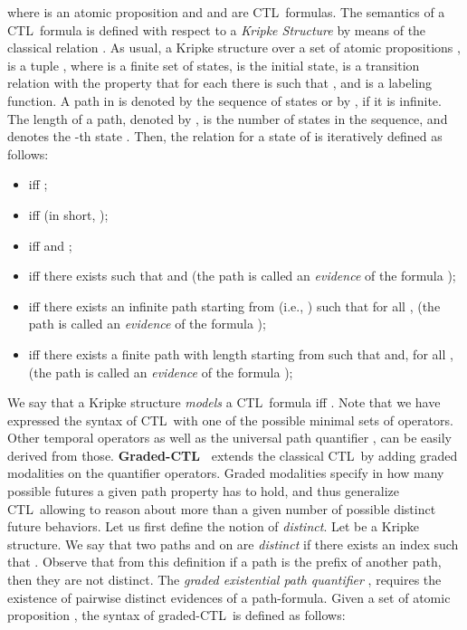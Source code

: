 \documentclass[letterpaper,twocolumn,10pt]{article}
\def    \ctl        {\mbox{\textsc{CTL }\xspace}}
\begin{document}
where  is an atomic proposition and  and
 are \ctl formulas.
The semantics of a \ctl formula is defined with respect to a
\emph{Kripke Structure} by means of the classical relation
. As usual, a Kripke structure over a set of atomic
propositions , is a tuple  , where  is a finite set of states,  is
the initial state,  is a transition
relation with the property that for each  there is  such that , and  is a
labeling function.
A path in  is denoted by the sequence of states  or by , if it is infinite. The length of a path, denoted by
, is the number of states in the sequence, and 
denotes the -th state .
Then, the relation  for a state  of  is
iteratively defined as follows:
\begin{itemize}
\item
 iff ;
\item
 iff 
(in short, );
\item
 iff  and ;
\item
 iff there exists  such
that  and  (the path
 is called an \emph{evidence} of the formula
);
\item
 iff there exists an infinite path
 starting from  (i.e., ) such that for all ,  (the path  is called
an \emph{evidence} of the formula );
\item
 iff there exists a finite
path  with length  starting from  such that
 and, for all ,  (the path  is called an
\emph{evidence} of the formula );
\end{itemize}
We say that a Kripke structure  \emph{models} a \ctl formula  iff .
Note that we have expressed the syntax of \ctl with one of the
possible minimal sets of operators. Other temporal operators as well as
the universal path quantifier ,  can be easily derived
from those.
\textbf{Graded-\ctl} extends the classical \ctl by adding graded modalities on the quantifier
operators. Graded modalities specify in how many possible futures  a given path property has to hold,
and thus generalize \ctl allowing to reason
about more than a given number of possible distinct future
behaviors. Let us first define the notion of {\em distinct}.
Let  be a Kripke structure. We say that two paths 
and  on  are \emph{distinct} if there exists an index
 such that . Observe that from this definition if a path is the
prefix of another path, then they are not distinct.
The \emph{graded existential path quantifier} , requires
the existence of  pairwise distinct evidences of a path-formula. Given a
set of atomic proposition , the syntax of graded-\ctl is
defined as follows:
    
\end{document}
